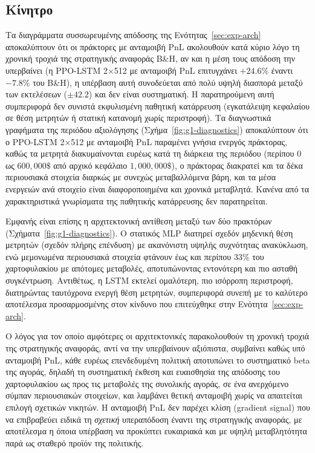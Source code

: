 \subsection{Κίνητρο}
\label{subsec:exp-reward-motivation}

Τα διαγράμματα συσσωρευμένης απόδοσης της Ενότητας~\ref{sec:exp-arch} αποκαλύπτουν ότι οι
πράκτορες με ανταμοιβή PnL ακολουθούν κατά κύριο λόγο τη χρονική τροχιά της στρατηγικής αναφοράς B\&H, 
αν και η μέση τους απόδοση την υπερβαίνει (η PPO-LSTM
2$\times$512 με ανταμοιβή PnL επιτυγχάνει $+24{.}6\%$ έναντι $-7{.}8\%$ του B\&H), η υπέρβαση αυτή
συνοδεύεται από πολύ υψηλή διασπορά μεταξύ των εκτελέσεων ($\pm 42{.}2$) και δεν είναι συστηματική.
Η παρατηρούμενη αυτή
συμπεριφορά δεν συνιστά εκφυλισμένη παθητική κατάρρευση (εγκατάλειψη κεφαλαίου σε θέση
μετρητών ή στατική κατανομή χωρίς περιστροφή). Τα διαγνωστικά γραφήματα της
περιόδου αξιολόγησης (Σχήμα~\ref{fig:g1-diagnostics}) αποκαλύπτουν ότι ο PPO-LSTM
2$\times$512 με ανταμοιβή PnL παραμένει γνήσια ενεργός πράκτορας, καθώς τα μετρητά διακυμαίνονται
ευρέως κατά τη διάρκεια της περιόδου (περίπου 0 ως $600,000\$$ από αρχικό κεφάλαιο $1,000,000\$$),
ο πράκτορας διακρατεί και τα δέκα περιουσιακά στοιχεία διαρκώς με συνεχώς μεταβαλλόμενα
βάρη, και τα μέσα ενεργειών ανά στοιχείο είναι διαφοροποιημένα και χρονικά μεταβλητά. 
Κανένα από τα χαρακτηριστικά γνωρίσματα της παθητικής κατάρρευσης δεν παρατηρείται.

Εμφανής είναι επίσης η αρχιτεκτονική αντίθεση μεταξύ των δύο πρακτόρων (Σχήματα~\ref{fig:g1-diagnostics}). 
Ο στατικός MLP διατηρεί σχεδόν μηδενική θέση μετρητών
(σχεδόν πλήρης επένδυση) με ακανόνιστη υψηλής συχνότητας ανακύκλωση, ενώ μεμονωμένα περιουσιακά
στοιχεία φτάνουν έως και περίπου 33\% του χαρτοφυλακίου με απότομες μεταβολές, αποτυπώνοντας
εντονότερη και πιο ασταθή συγκέντρωση. Αντιθέτως, η LSTM εκτελεί ομαλότερη, πιο ισόρροπη
περιστροφή, διατηρώντας ταυτόχρονα ενεργή θέση μετρητών, συμπεριφορά συνεπή με το καλύτερο
αποτέλεσμα προσαρμοσμένης στον κίνδυνο που επιτεύχθηκε στην Ενότητα~\ref{sec:exp-arch}.

Ο λόγος για τον οποίο αμφότερες οι αρχιτεκτονικές παρακολουθούν τη χρονική τροχιά της στρατηγικής αναφοράς, 
αντί να την υπερβαίνουν αξιόπιστα, συμβαίνει καθώς υπό ανταμοιβή PnL, κάθε ευρέως
επενδεδυμένη πολιτική αποτυπώνει το συστηματικό beta της αγοράς, δηλαδή τη συστηματική έκθεση
και ευαισθησία της απόδοσης του χαρτοφυλακίου ως προς τις μεταβολές της συνολικής αγοράς, σε ένα
ανερχόμενο σύμπαν περιουσιακών στοιχείων, και λαμβάνει θετική ανταμοιβή χωρίς να απαιτείται
επιλογή σχετικών νικητών. Η ανταμοιβή
PnL δεν παρέχει κλίση (gradient signal) που να επιβραβεύει ειδικά τη \emph{σχετική} υπεραπόδοση
έναντι της στρατηγικής αναφοράς, με αποτέλεσμα η όποια υπέρβαση να προκύπτει ευκαιριακά και με υψηλή
μεταβλητότητα παρά ως σταθερό προϊόν της πολιτικής.


